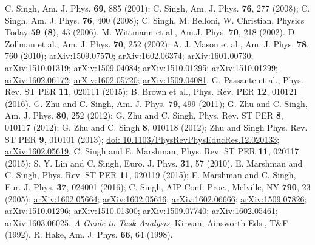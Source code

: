 \documentclass[aps,pra,showpacs,showkeys,twocolumn,groupedaddress]{revtex4-1}
\begin{document}
% 
\begin{thebibliography}{9}
 C. Singh, Am. J. Phys. \textbf{69}, 885 (2001); C. Singh, Am. J. Phys. \textbf{76}, 277 (2008); C. Singh, Am. J. Phys. \textbf{76}, 400 (2008); C. Singh, M. Belloni, W. Christian, Physics Today \textbf{59 (8)}, 43 (2006).
 M. Wittmann et al., Am.J. Phys. \textbf{70}, 218 (2002).
 D. Zollman et al., Am. J. Phys. \textbf{70}, 252 (2002); A. J. Mason et al., Am. J. Phys. \textbf{78}, 760 (2010); 
\href{https://arxiv.org/abs/1509.07570}{arXiv:1509.07570}; 
\href{https://arxiv.org/abs/1602.06374}{arXiv:1602.06374};
\href{https://arxiv.org/abs/1601.00730}{arXiv:1601.00730};
\href{https://arxiv.org/abs/1510.01319}{arXiv:1510.01319}; 
\href{https://arxiv.org/abs/1509.04084}{arXiv:1509.04084};
\href{https://arxiv.org/abs/1510.01295}{arXiv:1510.01295}; 
\href{https://arxiv.org/abs/1510.01299}{arXiv:1510.01299}; 
\href{https://arxiv.org/abs/1602.06172}{arXiv:1602.06172};
\href{https://arxiv.org/abs/1602.05720}{arXiv:1602.05720}; \href{https://arxiv.org/abs/1509.04081}{arXiv:1509.04081}.
  G. Passante et al., Phys. Rev. ST PER \textbf{11}, 020111 (2015); B. Brown et al., Phys. Rev. PER \textbf{12}, 010121 (2016). 
 G. Zhu and C. Singh,  Am. J. Phys. \textbf{79}, 499 (2011); G. Zhu and C. Singh, Am. J. Phys. \textbf{80}, 252 (2012); G. Zhu and C. Singh, Phys. Rev. ST PER \textbf{8}, 010117 (2012); G. Zhu and C. Singh \textbf{8}, 010118 (2012); Zhu and Singh Phys. Rev. ST PER \textbf{9}, 010101 (2013); 
\href{https://dx.doi.org/10.1103/PhysRevPhysEducRes.12.020133}{doi: 10.1103/PhysRevPhysEducRes.12.020133};
\href{https://arxiv.org/abs/1602.05619}{arXiv:1602.05619}.
 C. Singh and E. Marshman, Phys. Rev. ST PER \textbf{11}, 020117 (2015); S. Y. Lin and C. Singh, Euro. J. Phys. \textbf{31}, 57 (2010). 
 E. Marshman and C. Singh, Phys. Rev. ST PER \textbf{11}, 020119 (2015); E. Marshman and C. Singh, Eur. J. Phys. \textbf{37}, 024001 (2016); C. Singh, AIP Conf. Proc., Melville, NY \textbf{790}, 23 (2005); 
\href{https://arxiv.org/abs/1602.05664}{arXiv:1602.05664};
\href{https://arxiv.org/abs/1602.05616}{arXiv:1602.05616};
\href{https://arxiv.org/abs/1602.06666}{arXiv:1602.06666};
\href{https://arxiv.org/abs/1509.07826}{arXiv:1509.07826}; 
\href{https://arxiv.org/abs/1510.01296}{arXiv:1510.01296}; 	
\href{https://arxiv.org/abs/1510.01300}{arXiv:1510.01300}; 
\href{https://arxiv.org/abs/1509.07740}{arXiv:1509.07740};
\href{https://arxiv.org/abs/1602.05461}{arXiv:1602.05461};  \href{https://arxiv.org/abs/1603.06025}{arXiv:1603.06025}.
 {\it A Guide to Task Analysis}, Kirwan, Ainsworth Eds., T\&F (1992).
R. Hake, 
Am. J. Phys. {\bf 66}, 64 (1998).



\end{thebibliography}
\end{document}

